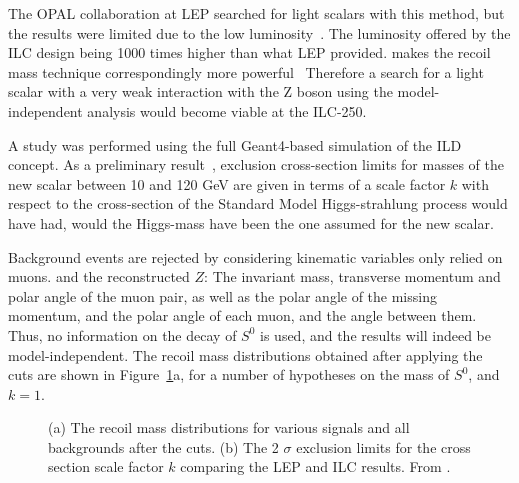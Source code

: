 The OPAL collaboration at LEP searched
for light scalars with this method,
but the  results were limited due to the low luminosity~\cite{Abbiendi:2002in}.
The luminosity offered by the ILC design being 1000
times higher than what LEP provided.
makes the recoil mass technique correspondingly more powerful~\cite{Asner:2013psa}
Therefore a search for a light scalar with a very weak interaction with
the Z boson using the model-independent analysis would become  viable
at the ILC-250.

A study was performed using the full Geant4-based simulation of the
ILD concept.
As a preliminary result~\cite{yanichep},
exclusion cross-section limits for
masses of the new scalar between 10 and 120
GeV are given in terms of a scale factor $k$ with respect to the
cross-section of the Standard Model Higgs-strahlung process would
have had, would the Higgs-mass have been the one assumed for the new scalar.

Background events are rejected by considering kinematic variables
only relied on muons. and the reconstructed $Z$:
The invariant mass, transverse momentum and polar angle of the muon pair,
as well as the polar angle of the missing momentum,
and the polar angle of each muon, and the angle between them.
Thus, no information on the decay of $S^0$ is used,
and the results will indeed be model-independent.
The recoil mass distributions obtained after applying the cuts
are shown in Figure~\ref{fig:searches_newscalars}a, 
for a number of hypotheses
on the mass of $S^0$, and $k=1$.
\begin{figure}[]
\setlength{\unitlength}{1.0cm}
\hspace{0.05\linewidth}
\caption{\label{fig:searches_newscalars} (a) The recoil mass distributions for various signals
and all backgrounds after the cuts.
(b) The 2 $\sigma$ exclusion limits for the cross section scale factor $k$ comparing the LEP and
ILC results. From \cite{yanichep}.}
\end{figure}

